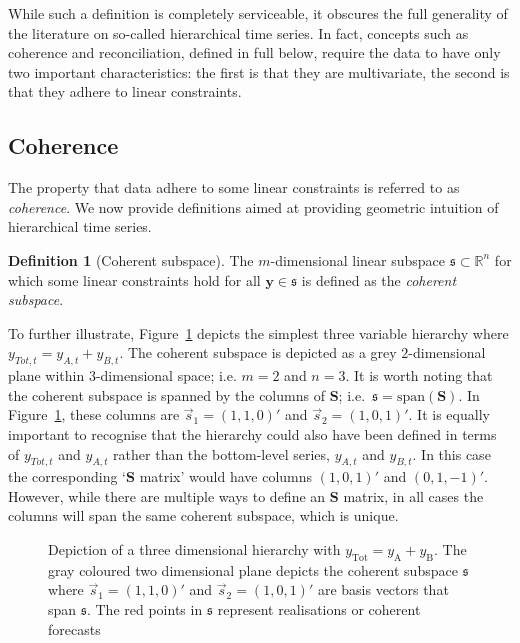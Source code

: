 \documentclass[12pt]{article}
\theoremstyle{definition}
\newtheorem{definition}{Definition}[section]
\begin{document}
While such a definition is completely serviceable, it obscures the full generality of the literature on so-called hierarchical time series. In fact, concepts such as coherence and reconciliation, defined in full below, require the data to have only two important characteristics: the first is that they are multivariate, the second is that they adhere to linear constraints.

\subsection{Coherence}\label{sec:cohpointf}

The property that data adhere to some linear constraints is referred to as \emph{coherence}. We now provide definitions aimed at providing geometric intuition of hierarchical time series.

\begin{definition}[Coherent subspace]\label{def:cohspace}
   The $m$-dimensional linear subspace $\mathfrak{s}\subset \mathbb{R}^n$ for which some linear constraints hold for all $\bm{y}\in\mathfrak{s}$ is defined as the \emph{coherent subspace}.
\end{definition}

To further illustrate, Figure~\ref{fig:3D_hierarchy} depicts the simplest three variable hierarchy where $y_{Tot,t}=y_{A,t}+y_{B,t}$. The coherent subspace is depicted as a grey $2$-dimensional plane within $3$-dimensional space; i.e. $m=2$ and $n=3$. It is worth noting that the coherent subspace is spanned by the columns of $\bm{S}$; i.e.\ $\mathfrak{s}=\text{span}(\bm{S})$. In Figure~\ref{fig:3D_hierarchy}, these columns are $\vec{s}_1=(1,1,0)'$ and $\vec{s}_2=(1,0,1)'$. It is equally important to recognise that the hierarchy could also have been defined in terms of $y_{Tot,t}$ and $y_{A,t}$ rather than the bottom-level series, $y_{A,t}$ and $y_{B,t}$. In this case the corresponding `$\bm{S}$ matrix' would have columns $(1,0,1)'$ and $(0,1,-1)'$. However, while there are multiple ways to define an $\bm{S}$ matrix, in all cases the columns will span the same coherent subspace, which is unique.

\begin{figure}[!hbt]
   \centering
   \vspace{-0.9cm}
   \small
   \resizebox{0.8\linewidth}{!}{
     
   }
   \caption{Depiction of a three dimensional hierarchy with $y_{\text{Tot}} = y_{\text{A}} + y_{\text{B}}$. The gray coloured two dimensional plane depicts the coherent subspace $\mathfrak{s}$ where $\vec{s}_1 = (1,1,0)'$ and $\vec{s}_2 = (1, 0, 1)'$ are basis vectors that span $\mathfrak{s}$. The red points in $\mathfrak{s}$ represent realisations or coherent forecasts}\label{fig:3D_hierarchy}
\end{figure}
\end{document}
